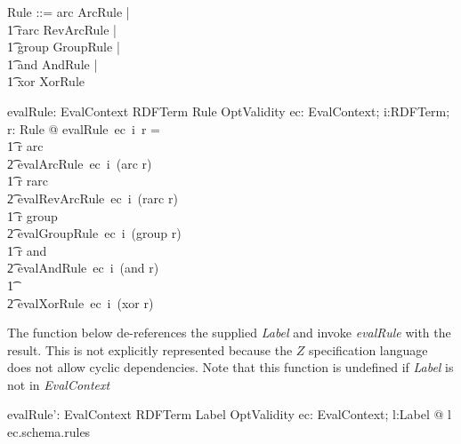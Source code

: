 \documentclass[fuzz]{llncs}
\def\entryFor{\cdot}
\def\zc{\textit}
\begin{document}
\begin{zed}
Rule ::= arc \ldata ArcRule \rdata | \\
\t1 rarc \ldata RevArcRule \rdata | \\
\t1 group \ldata GroupRule \rdata | \\
\t1 and \ldata AndRule \rdata | \\
\t1 xor \ldata XorRule \rdata \\
\end{zed}
\begin{gendef}
   evalRule: EvalContext \fun RDFTerm \fun Rule \fun OptValidity
\where
   \forall ec: EvalContext; i:RDFTerm; r: Rule @ evalRule~ec~i~r = \\
\t1 \IF r \in \ran arc \\
\t2 \THEN evalArcRule~ec~i~(arc \entryFor r) \\
\t1 \ELSE \IF r \in \ran rarc \\
\t2 \THEN evalRevArcRule~ec~i~(rarc \entryFor r) \\
\t1 \ELSE \IF r \in \ran group \\
\t2 \THEN evalGroupRule~ec~i~(group \entryFor r) \\
\t1 \ELSE \IF r \in \ran and \\
\t2 \THEN evalAndRule~ec~i~(and \entryFor r) \\
\t1 \ELSE \\
\t2 evalXorRule~ec~i~(xor \entryFor r)
\end{gendef}
The function below de-references the supplied \zc{Label} and
invoke \zc{evalRule} with the result.  This is not explicitly represented because
the $Z$ specification language does not allow cyclic dependencies. Note that this function
is undefined if \zc{Label} is not in \zc{EvalContext}
\begin{gendef}
   evalRule': EvalContext \fun RDFTerm \fun Label \fun OptValidity
\where
   \forall ec: EvalContext; l:Label @ l \in \dom ec.schema.rules
\end{gendef}
\end{document}
